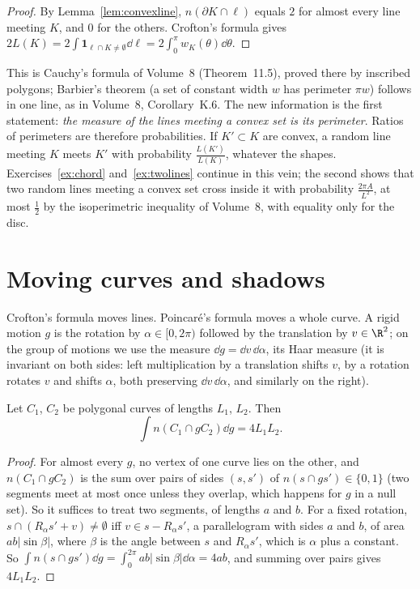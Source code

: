 \begin{proof}
By Lemma~\ref{lem:convexline}, $n(\partial K\cap\ell)$ equals $2$ for almost every line meeting $K$, and $0$ for the others. Crofton's formula gives $2L(K)=2\int\mathbf 1_{\ell\cap K\neq\emptyset}\dd\ell=2\int_0^\pi w_K(\theta)\dd\theta$.
\end{proof}

This is Cauchy's formula of Volume~8 (Theorem~11.5), proved there by inscribed polygons; Barbier's theorem (a set of constant width $w$ has perimeter $\pi w$) follows in one line, as in Volume~8,
Corollary~K.6. The new information is the first statement: \emph{the measure of the lines meeting a convex set is its perimeter}. Ratios of perimeters are therefore probabilities. If $K'\subset K$ are
convex, a random line meeting $K$ meets $K'$ with probability $\frac{L(K')}{L(K)}$, whatever the shapes. Exercises~\ref{ex:chord} and~\ref{ex:twolines} continue in this vein; the second shows that two random
lines meeting a convex set cross inside it with probability $\frac{2\pi A}{L^2}$, at most $\frac12$ by the isoperimetric inequality of Volume~8, with equality only for the disc.

\section{Moving curves and shadows}

Crofton's formula moves lines. Poincaré's formula moves a whole curve. A rigid motion $g$ is the rotation by $\alpha\in[0,2\pi)$ followed by the translation by $v\in\R^2$; on the group of motions we use the
measure $\dd g=\dd v\,\dd\alpha$, its Haar measure (it is invariant on both sides: left multiplication by a translation shifts $v$, by a rotation rotates $v$ and shifts $\alpha$, both preserving $\dd v\,\dd\alpha$, and
similarly on the right).

\begin{theorem}[Poincaré, 1896]\label{thm:poincare}
Let $C_1$, $C_2$ be polygonal curves of lengths $L_1$, $L_2$. Then
\[\int n(C_1\cap gC_2)\dd g=4L_1L_2.\]
\end{theorem}

\begin{proof}
For almost every $g$, no vertex of one curve lies on the other, and $n(C_1\cap gC_2)$ is the sum over pairs of sides $(s,s')$ of $n(s\cap gs')\in\{0,1\}$ (two segments meet at most once unless they overlap, which happens for
$g$ in a null set). So it suffices to treat two segments, of lengths $a$ and $b$. For a fixed rotation, $s\cap(R_\alpha s'+v)\neq\emptyset$ iff $v\in s-R_\alpha s'$, a parallelogram with sides $a$ and $b$, of area $ab|\sin\beta|$,
where $\beta$ is the angle between $s$ and $R_\alpha s'$, which is $\alpha$ plus a constant. So $\int n(s\cap gs')\dd g=\int_0^{2\pi}ab|\sin\beta|\dd\alpha=4ab$, and summing over pairs gives $4L_1L_2$.
\end{proof}

